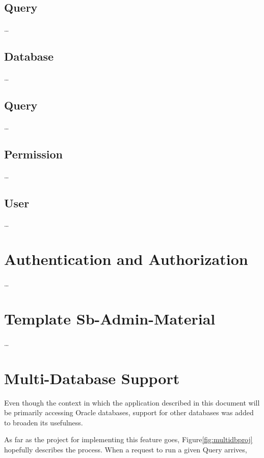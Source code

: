 \subsection{Query}
\dots
\subsection{Database}
\dots
\subsection{Query}\label{model:query}
\dots
\subsection{Permission}
\dots
\subsection{User}\label{model:user}
\dots

\section{Authentication and Authorization}\label{proj:auth}
\dots

\section{Template Sb-Admin-Material}
\dots
\section{Multi-Database Support}


Even though the context in which the application described in this document will be primarily accessing Oracle databases, support for other databases was added to broaden its usefulness.

As far as the project for implementing this feature goes, Figure\ref{fig:multidbproj} hopefully describes the process. When a request to run a given Query arrives,
